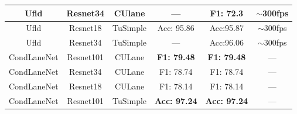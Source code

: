 \begin{table}[]
\begin{tabular}{|c|c|c|c|c|c|}
Ufld              & Resnet34                                                            & CUlane           & —                                                                     & F1: 72.3                                                            & $\sim$300fps                                                                        \\ \hline
Ufld              & Resnet18                                                            & TuSimple         & Acc: 95.86                                                            & Acc:95.87                                                           & $\sim$300fps                                                                        \\ \hline
Ufld              & Resnet34                                                            & TuSimple         & —                                                                     & Acc:96.06                                                           & $\sim$300fps                                                                        \\ \hline
CondLaneNet       & Resnet101                                                           & CULane           & \textbf{F1: 79.48}                                                    & \textbf{F1: 79.48}                                                  & —                                                                                   \\ \hline
CondLaneNet       & Resnet34                                                            & CULane           & F1: 78.74                                                             & F1: 78.74                                                           & —                                                                                   \\ \hline
CondLaneNet       & Resnet18                                                            & CULane           & F1: 78.14                                                             & F1: 78.14                                                           & —                                                                                   \\ \hline
CondLaneNet       & Resnet101                                                           & TuSimple         & \textbf{Acc: 97.24}                                                   & \textbf{Acc: 97.24}                                                 & —                                                                                   \\ \hline

\end{tabular}
\end{table}
